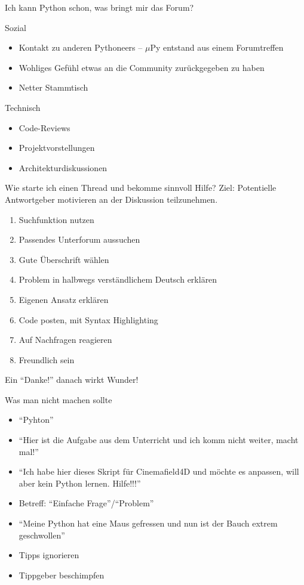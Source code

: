 \documentclass{beamer}
\begin{document}
\begin{frame}{Ich kann Python schon, was bringt mir das Forum?}
  \begin{block}{Sozial}
    \begin{itemize}
      \item Kontakt zu anderen Pythoneers – $\mu$Py entstand aus einem Forumtreffen
      \item Wohliges Gefühl etwas an die Community zurückgegeben zu haben 
      \item Netter Stammtisch
    \end{itemize}
  \end{block}
  \begin{block}{Technisch}
    \begin{itemize}
      \item Code-Reviews
      \item Projektvorstellungen
      \item Architekturdiskussionen
    \end{itemize}
  \end{block}
\end{frame}

\begin{frame}{Wie starte ich einen Thread und bekomme sinnvoll Hilfe?}
  Ziel: Potentielle Antwortgeber motivieren an der Diskussion teilzunehmen.
  \begin{enumerate}
    \item Suchfunktion nutzen
    \item Passendes Unterforum aussuchen
    \item Gute Überschrift wählen
    \item Problem in halbwegs verständlichem Deutsch erklären
    \item Eigenen Ansatz erklären
    \item Code posten, mit Syntax Highlighting
    \item Auf Nachfragen reagieren
    \item Freundlich sein
  \end{enumerate}
  Ein \enquote{Danke!} danach wirkt Wunder!
\end{frame}

\begin{frame}{Was man nicht machen sollte}
  \begin{itemize}
    \item \enquote{Pyhton} 
    \item \enquote{Hier ist die Aufgabe aus dem Unterricht und ich komm nicht weiter,
      macht mal!}
    \item \enquote{Ich habe hier dieses Skript für Cinemafield4D und möchte es
      anpassen, will aber kein Python lernen. Hilfe!!!}
    \item Betreff: \enquote{Einfache Frage}/\enquote{Problem}
    \item \enquote{Meine Python hat eine Maus gefressen und nun ist der Bauch extrem geschwollen} 
    \item Tipps ignorieren
    \item Tippgeber beschimpfen
  \end{itemize}
\end{frame}
\end{document}
